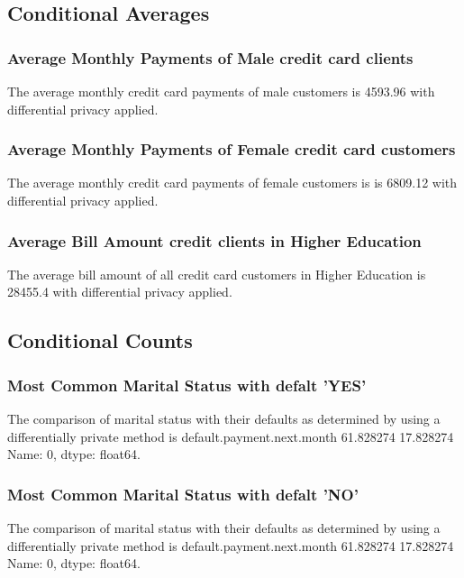 \documentclass{article}%
\begin{document}
%
\subsection{Conditional Averages}%
\label{subsec:ConditionalAverages}%
\subsubsection{Average Monthly Payments of Male credit card clients}%
\label{ssubsec:AverageMonthlyPaymentsofMalecreditcardclients}%
The average monthly credit card payments of male customers is 4593.96 with differential privacy applied.

%
\subsubsection{Average Monthly Payments of Female credit card customers}%
\label{ssubsec:AverageMonthlyPaymentsofFemalecreditcardcustomers}%
The average monthly credit card payments of female customers is is 6809.12 with differential privacy applied.

%
\subsubsection{Average Bill Amount credit clients in Higher Education}%
\label{ssubsec:AverageBillAmountcreditclientsinHigherEducation}%
The average bill amount of all credit card customers in Higher Education is 28455.4 with differential privacy applied.

%
\subsection{Conditional Counts}%
\label{subsec:ConditionalCounts}%
\subsubsection{Most Common Marital Status with defalt 'YES'}%
\label{ssubsec:MostCommonMaritalStatuswithdefaltYES}%
The comparison of marital status with their defaults as determined by using a differentially private method is default.payment.next.month    61.828274    17.828274\newline%
Name: 0, dtype: float64.

%
\subsubsection{Most Common Marital Status with defalt 'NO'}%
\label{ssubsec:MostCommonMaritalStatuswithdefaltNO}%
The comparison of marital status with their defaults as determined by using a differentially private method is default.payment.next.month    61.828274    17.828274\newline%
Name: 0, dtype: float64.

%
\end{document}
